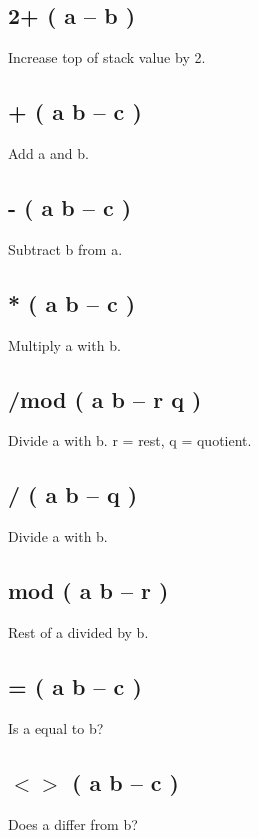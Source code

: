 \subsection{2+ ( a -- b )}

Increase top of stack value by 2.

\subsection{+ ( a b -- c )}

Add a and b.

\subsection{- ( a b -- c )}

Subtract b from a.

\subsection{* ( a b -- c )}

Multiply a with b.

\subsection{/mod ( a b -- r q )}

Divide a with b. r = rest, q = quotient.

\subsection{/ ( a b -- q )}

Divide a with b.

\subsection{mod ( a b -- r )}

Rest of a divided by b.

\subsection{= ( a b -- c )}

Is a equal to b?

\subsection{$<>$ ( a b -- c )}

Does a differ from b?

